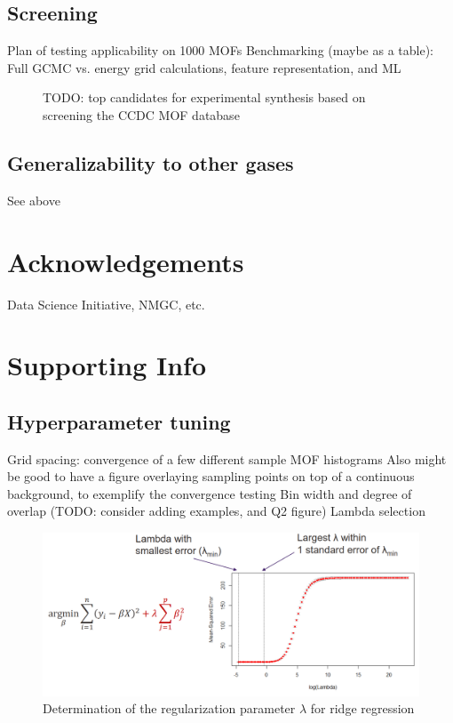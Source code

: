 \documentclass[letterpaper]{article}
\begin{document}
\subsection{Screening}
\begin{outline}
	\1 Plan of testing applicability on 1000 MOFs
	\1 Benchmarking (maybe as a table): Full GCMC vs. energy grid calculations, feature representation, and ML
\end{outline}
\begin{figure}[!ht]
	\centering
	\caption{TODO: top candidates for experimental synthesis based on screening the CCDC MOF database}
	\label{fig:candidates}
\end{figure}

\subsection{Generalizability to other gases}
\begin{outline}
	\1 See above
\end{outline}


\section{Acknowledgements}
Data Science Initiative, NMGC, etc.


\pagebreak
\section{Supporting Info}

\subsection{Hyperparameter tuning}

\begin{outline}
	\1 Grid spacing: convergence of a few different sample MOF histograms
		\2 Also might be good to have a figure overlaying sampling points on top of a continuous background, to exemplify the convergence testing
	\1 Bin width and degree of overlap (TODO: consider adding examples, and Q2 figure)
	\1 Lambda selection
	\begin{figure}[!ht]
		\centering
		\includegraphics[width=0.75\columnwidth]{Figs/lambda.png}
		\caption{Determination of the regularization parameter $\lambda$ for ridge regression}
		\label{fig:lambda}
	\end{figure}
\end{outline}
\end{document}
